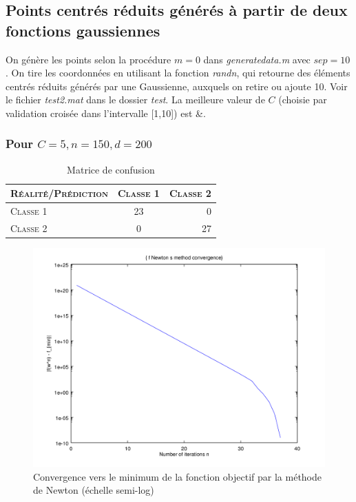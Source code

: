 \documentclass{article}
\begin{document}
\subsection{Points centrés réduits générés à partir de deux fonctions gaussiennes}

On génère les points selon la procédure $m = 0$ dans \emph{generatedata.m} avec $sep=10$. On tire les coordonnées en utilisant la fonction \emph{randn}, qui retourne des éléments centrés réduits générés par une Gaussienne, auxquels on retire ou ajoute 10. Voir le fichier \emph{test2.mat} dans le dossier \emph{test}. La meilleure valeur de $C$ (choisie par validation croisée dans l'intervalle [1,10]) est &.

\subsubsection{Pour $C=5, n=150, d=200$}

     \begin{table}[H]
       \caption{Matrice de confusion}
       \begin{tabular}{|l|c|r|}
         \hline
         \textsc{Réalité/Prédiction} & \textsc{Classe 1} & \textsc{Classe 2}\\
         \hline
         \textsc{Classe 1} & 23 & 0\\
         \hline
         \textsc{Classe 2} & 0 & 27\\
         \hline
       \end{tabular}
     \end{table}

         \begin{figure}
           \begin{center}
             \includegraphics[scale=0.5]{images/cvnewton2.png}
             \caption{Convergence vers le minimum de la fonction objectif par la méthode de Newton (échelle semi-log)}
           \end{center}
         \end{figure}
\end{document}
